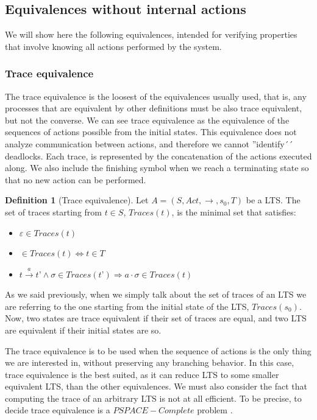 \documentclass[11pt]{article}
\theoremstyle{definition}
\newtheorem{definition}{Definition}
\newcommand{\cmark}{\ding{51}}
\theoremstyle{plain}
\theoremstyle{definition}
\begin{document}
\subsection{Equivalences without internal actions}
We will show here the following equivalences, intended for verifying properties that involve knowing all actions performed by the system.
\subsubsection{Trace equivalence} 
The trace equivalence is the loosest of the equivalences usually used, that is, any processes that are equivalent by other definitions must be also trace equivalent, but not the converse. We can see trace equivalence as the equivalence of the sequences of actions possible from the initial states. This equivalence does not analyze communication between actions, and therefore we cannot ''identify´´ deadlocks. Each trace, is represented by the concatenation of the actions executed along. We also include the finishing symbol when we reach a terminating state so that no new action can be performed.
\begin{definition} [Trace equivalence]
	Let $ A = (S, Act, \rightarrow, s_0, T) $ be a LTS. The set of traces starting from $ t \in S$, $ Traces(t) $, is the minimal set that satisfies:
	\begin{itemize}
		\item $ \varepsilon \in Traces(t) $
		\item \cmark $ \in Traces(t) \iff t \in T $
		\item $ t\xrightarrow{a} t’ \wedge \sigma \in Traces(t’) \Rightarrow a\cdot\sigma \in Traces(t) $
	\end{itemize}
\end{definition}

As we said previously, when we simply talk about the set of traces of an LTS we are referring to the one starting from the initial state of the LTS, $ Traces(s_0) $. Now, two states are trace equivalent if their set of traces are equal, and two LTS are equivalent if their initial states are so. 

The trace equivalence is to be used when the sequence of actions is the only thing we are interested in, without preserving any branching behavior. In this case, trace equivalence is the best suited, as it can reduce LTS to some smaller equivalent LTS, than the other equivalences.
We must also consider the fact that computing the trace of an arbitrary LTS is not at all efficient. To be precise, to decide trace equivalence is a $ PSPACE-Complete $ problem \cite{KANELLAKIS199043}.
\end{document}
